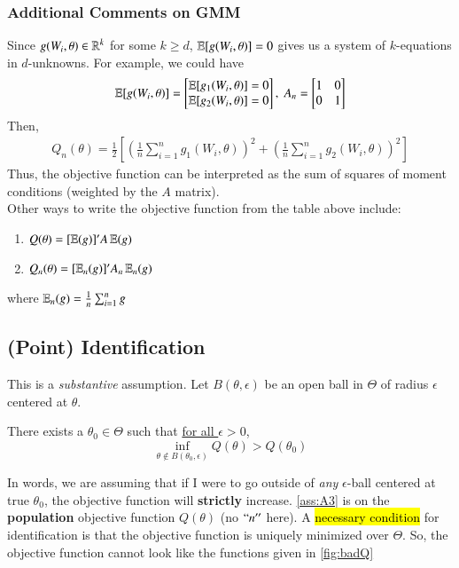 \documentclass[../main.tex]{subfiles}
\begin{document}
\subsubsection{Additional Comments on GMM}
Since $g(W_i, \theta) \in \operatorname{\mathbb{R}}^k$ for some $k \geq d$, $\operatorname{\mathbb{E}}[g(W_i, \theta)] = 0$ gives us a system of $k$-equations in $d$-unknowns. For example, we could have
\begin{align*}
	\operatorname{\mathbb{E}}[g(W_i, \theta)] = 
	\begin{bmatrix}
		\operatorname{\mathbb{E}}[g_1(W_i, \theta)] = 0 \\
		\operatorname{\mathbb{E}}[g_2(W_i, \theta)] = 0 
	\end{bmatrix}, \;
	A_n = 
	\begin{bmatrix}
		1 & 0 \\
		0 & 1
	\end{bmatrix}
\end{align*}
Then, 
\begin{align*}
	Q_n(\theta) = \frac{1}{2}\left[\left(\frac{1}{n} \sum_{i = 1}^{n} g_1(W_i, \theta)\right)^2 + \left(\frac{1}{n} \sum_{i = 1}^{n} g_2(W_i, \theta)\right)^2 \right]
\end{align*}
Thus, the objective function can be interpreted as the sum of squares of moment conditions (weighted by the $A$ matrix). \\

Other ways to write the objective function from the table above include:
\begin{enumerate}
	\item $Q(\theta) = [\operatorname{\mathbb{E}}(g)]'A\operatorname{\mathbb{E}}(g)$
	\item $Q_n(\theta) = [\operatorname{\mathbb{E}}_n(g)]'A_n\operatorname{\mathbb{E}}_n(g)$
\end{enumerate}
where $\operatorname{\mathbb{E}}_n(g) = \frac{1}{n} \sum_{i = 1}^{n} g$


\subsection{(Point) Identification}
This is a \emph{substantive} assumption. Let $B(\theta, \epsilon)$ be an open ball in $\Theta$ of radius $\epsilon$ centered at $\theta$.
\begin{ass}[ID]\label{ass:A3}
There exists a $\theta_0 \in \Theta$ such that \ul{for all $\epsilon > 0$},
	$$\inf_{\theta \not\in B(\theta_0, \epsilon)} Q(\theta) > Q(\theta_0)$$
\end{ass}

In words, we are assuming that if I were to go outside of \emph{any} $\epsilon$-ball centered at true $\theta_0$, the objective function will \textbf{strictly} increase. \cref{ass:A3} is on the \textbf{population} objective function $Q(\theta)$ (no $``n''$ here). A \hl{necessary condition} for identification is that the objective function is uniquely minimized over $\Theta$. So, the objective function cannot look like the functions given in \cref{fig:badQ}
\end{document}
